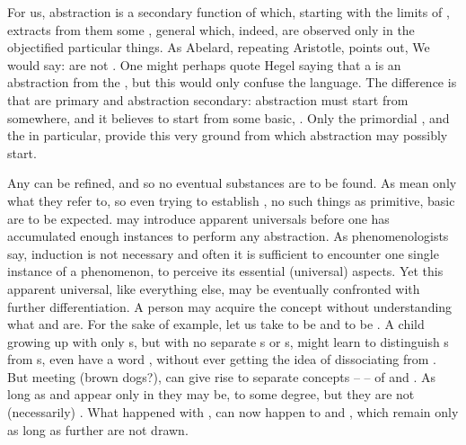 
For us, abstraction is a secondary function of  which, starting
with the  limits of , extracts from them some
, general  which, indeed, are observed only in the
{objectified} particular things. As Abelard, repeating Aristotle, points out,
 We would 
say:  are not . One might perhaps quote Hegel
saying that a 
 is an abstraction from the , but this would only
confuse the language. The difference is that  are primary and
abstraction secondary: abstraction must start from somewhere, and it believes to
start from some basic, .  Only the primordial
, and the  in particular, provide
this very ground from which abstraction may possibly 
start. 

Any  can be refined, and so no eventual substances are to be
found. As  mean only what they refer to, so even trying to
establish , no such things as primitive, basic
 are to be expected.   may introduce apparent
universals before one has accumulated enough  instances to
perform any abstraction. As phenomenologists say, induction is not necessary and
often it is sufficient to encounter one single instance of a phenomenon, to
perceive its essential (universal) aspects. Yet this apparent universal, like
everything else, may be eventually confronted with further differentiation. A
person may acquire the concept  without understanding what  and
 are. For the sake of example, let us take  to be  and
 to be .  A child growing up with only s, but with no
separate s or s, might learn to distinguish s from
s, even have a word , without ever getting the idea of
dissociating  from . But meeting  (brown dogs?), can give
rise to separate concepts --  -- of  and .  As
long as  and  appear only in  they may be, to some degree,
 but they are not (necessarily) .  What happened
with , can now happen to  and , which remain
 only as long as further  are not drawn.


